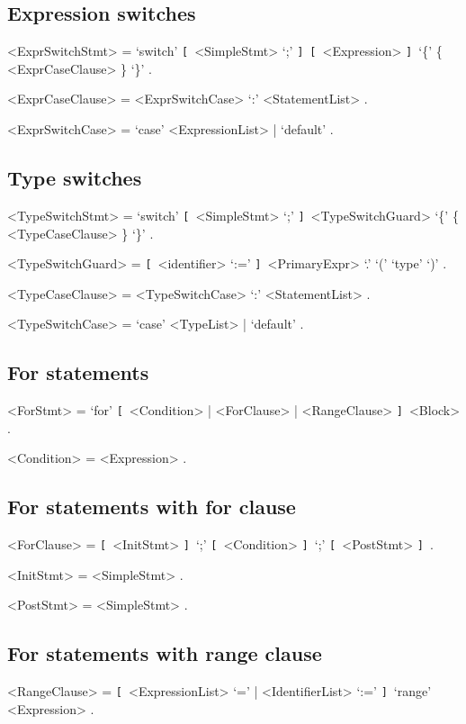 \documentclass{article}
\def\lopt{\synshortsoff\texttt{[}\synshorts~}
\def\ropt{\synshortsoff\texttt{]}\synshorts~}
\begin{document}
\subsection*{Expression switches}
\begin{grammar}
	<ExprSwitchStmt> = `switch' \lopt <SimpleStmt> `;' \ropt \lopt <Expression> \ropt `\{' \{ <ExprCaseClause> \} `\}' .

	<ExprCaseClause> = <ExprSwitchCase> `:' <StatementList> .

	<ExprSwitchCase> = `case' <ExpressionList> | `default' .
\end{grammar}

\subsection*{Type switches}
\begin{grammar}
	<TypeSwitchStmt>  = `switch' \lopt <SimpleStmt> `;' \ropt <TypeSwitchGuard> `\{' \{ <TypeCaseClause> \} `\}' .

	<TypeSwitchGuard> = \lopt <identifier> `:=' \ropt <PrimaryExpr> `.' `(' `type' `)' .

	<TypeCaseClause> = <TypeSwitchCase> `:' <StatementList> .

	<TypeSwitchCase> = `case' <TypeList> | `default' .
\end{grammar}



\subsection*{For statements}
\begin{grammar}
	<ForStmt> = `for' \lopt <Condition> | <ForClause> | <RangeClause> \ropt <Block> .

	<Condition> = <Expression> .
\end{grammar}

\subsection*{For statements with for clause}
\begin{grammar}
	<ForClause> = \lopt <InitStmt> \ropt `;' \lopt <Condition> \ropt `;' \lopt <PostStmt> \ropt .

	<InitStmt> = <SimpleStmt> .

	<PostStmt> = <SimpleStmt> .
\end{grammar}

\subsection*{For statements with range clause}
\begin{grammar}
	<RangeClause> = \lopt <ExpressionList> `=' | <IdentifierList> `:=' \ropt `range' <Expression> .
\end{grammar}
\end{document}
